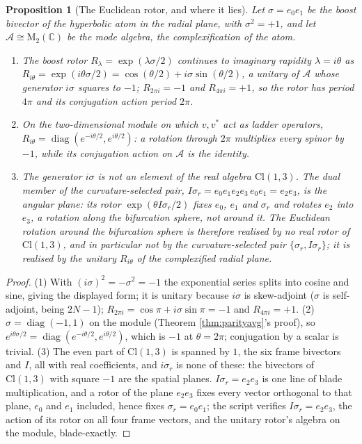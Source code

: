 \documentclass[11pt]{article}
\newtheorem{proposition}[theorem]{Proposition}
\theoremstyle{definition}
\newcommand{\Cl}{\mathrm{Cl}}
\newcommand{\C}{\mathbb{C}}
\newcommand{\Mat}{\mathrm{M}}
\newcommand{\Aa}{\mathcal{A}}
\begin{document}
\begin{proposition}[The Euclidean rotor, and where it lies]\label{prop:euclid}
Let $\sigma = e_0e_1$ be the boost bivector of the hyperbolic atom in the radial plane, with $\sigma^{2} = +1$, and let $\Aa \cong \Mat_2(\C)$ be the mode algebra, the complexification of the atom.
\begin{enumerate}
\item The boost rotor $R_\lambda = \exp(\lambda\sigma/2)$ continues to imaginary rapidity $\lambda = i\theta$ as $R_{i\theta} = \exp(i\theta\sigma/2) = \cos(\theta/2) + i\sigma\sin(\theta/2)$, a unitary of $\Aa$ whose generator $i\sigma$ squares to $-1$; $R_{2\pi i} = -1$ and $R_{4\pi i} = +1$, so the rotor has period $4\pi$ and its conjugation action period $2\pi$.
\item On the two-dimensional module on which $v, v^{*}$ act as ladder operators, $R_{i\theta} = \operatorname{diag}(e^{-i\theta/2}, e^{i\theta/2})$: a rotation through $2\pi$ multiplies every spinor by $-1$, while its conjugation action on $\Aa$ is the identity.
\item The generator $i\sigma$ is not an element of the real algebra $\Cl(1,3)$. The dual member of the curvature-selected pair, $I\sigma_r = e_0e_1e_2e_3\,e_0e_1 = e_2e_3$, is the \emph{angular} plane: its rotor $\exp(\theta I\sigma_r/2)$ fixes $e_0$, $e_1$ and $\sigma_r$ and rotates $e_2$ into $e_3$, a rotation along the bifurcation sphere, not around it. The Euclidean rotation around the bifurcation sphere is therefore realised by no real rotor of $\Cl(1,3)$, and in particular not by the curvature-selected pair $\{\sigma_r, I\sigma_r\}$; it is realised by the unitary $R_{i\theta}$ of the complexified radial plane.
\end{enumerate}
\end{proposition}

\begin{proof}
(1) With $(i\sigma)^{2} = -\sigma^{2} = -1$ the exponential series splits into cosine and sine, giving the displayed form; it is unitary because $i\sigma$ is skew-adjoint ($\sigma$ is self-adjoint, being $2N - 1$); $R_{2\pi i} = \cos\pi + i\sigma\sin\pi = -1$ and $R_{4\pi i} = +1$. (2) $\sigma = \operatorname{diag}(-1, 1)$ on the module (Theorem \ref{thm:parityavg}'s proof), so $e^{i\theta\sigma/2} = \operatorname{diag}(e^{-i\theta/2}, e^{i\theta/2})$, which is $-1$ at $\theta = 2\pi$; conjugation by a scalar is trivial. (3) The even part of $\Cl(1,3)$ is spanned by $1$, the six frame bivectors and $I$, all with real coefficients, and $i\sigma_r$ is none of these: the bivectors of $\Cl(1,3)$ with square $-1$ are the spatial planes. $I\sigma_r = e_2e_3$ is one line of blade multiplication, and a rotor of the plane $e_2e_3$ fixes every vector orthogonal to that plane, $e_0$ and $e_1$ included, hence fixes $\sigma_r = e_0e_1$; the script verifies $I\sigma_r = e_2e_3$, the action of its rotor on all four frame vectors, and the unitary rotor's algebra on the module, blade-exactly.
\end{proof}
\end{document}
